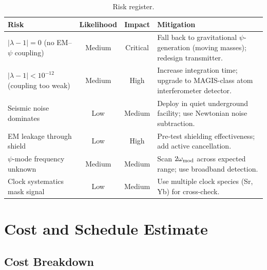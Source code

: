 \documentclass[11pt,onecolumn]{article}
\begin{document}
\begin{table}[H]
\centering
\caption{Risk register.}
\label{tab:risks}
\begin{tabular}{p{}ccp{}}
\toprule
Risk & Likelihood & Impact & Mitigation \\
\midrule
$|\lambda - 1| = 0$ (no EM--$\psi$ coupling) & Medium & Critical &
Fall back to gravitational $\psi$-generation (moving masses); redesign
transmitter. \\
\addlinespace
$|\lambda - 1| < 10^{-12}$ (coupling too weak) & Medium & High &
Increase integration time; upgrade to MAGIS-class atom interferometer
detector. \\
\addlinespace
Seismic noise dominates & Low & Medium &
Deploy in quiet underground facility; use Newtonian noise subtraction. \\
\addlinespace
EM leakage through shield & Low & High &
Pre-test shielding effectiveness; add active cancellation. \\
\addlinespace
$\psi$-mode frequency unknown & Medium & Medium &
Scan $2\omega_{\rm mod}$ across expected range; use broadband detection. \\
\addlinespace
Clock systematics mask signal & Low & Medium &
Use multiple clock species (Sr, Yb) for cross-check. \\
\bottomrule
\end{tabular}
\end{table}

\section{Cost and Schedule Estimate}

\subsection{Cost Breakdown}
\end{document}
